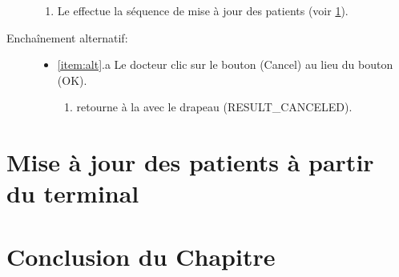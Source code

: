 \begin{description}
\begin{enumerate}
\item Le  effectue la séquence de mise à jour des patients (voir \ref{s:patientUpdate}).

\end{enumerate}

\item [Enchaînement alternatif:]

\begin{itemize}

\item \ref{item:alt}.a Le docteur clic sur le bouton (Cancel) au lieu du bouton (OK).
\begin{enumerate}

\item {} retourne à la  avec le drapeau (RESULT\_CANCELED).

\end{enumerate}

\end{itemize}


\end{description}

\section{Mise à jour des patients à partir du terminal}
\label{s:patientUpdate}

\section{Conclusion du Chapitre}